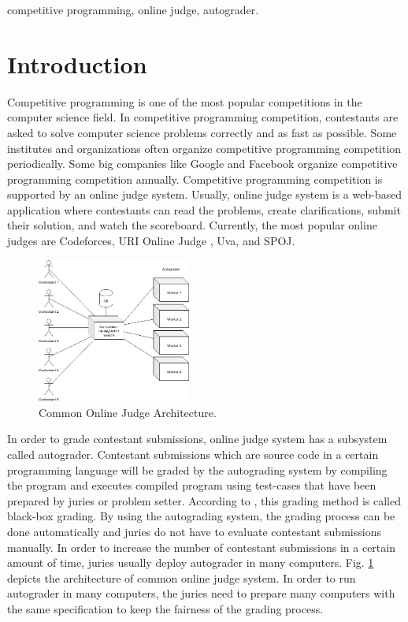 \documentclass[conference,a4paper]{IEEEtran}
\begin{document}
\begin{IEEEkeywords}
competitive programming, online judge, autograder.
\end{IEEEkeywords}

\section{Introduction}

Competitive programming is one of the most popular competitions in the computer science field. In competitive programming competition, contestants are asked to solve computer science problems correctly and as fast as possible. Some institutes and organizations often organize competitive programming competition periodically. Some big companies like Google and Facebook organize competitive programming competition annually. Competitive programming competition is supported by an online judge system. Usually, online judge system is a web-based application where contestants can read the problems, create clarifications, submit their solution, and watch the scoreboard. Currently, the most popular online judges are Codeforces, URI Online Judge \cite{uriojpaper}, Uva, and SPOJ.

\begin{figure}[htbp]
\centerline{\includegraphics[width=0.45\textwidth]{images/paper-architecture-old.jpeg}}
\caption{Common Online Judge Architecture.}
\label{architecture-old}
\end{figure}

In order to grade contestant submissions, online judge system has a subsystem called autograder. Contestant submissions which are source code in a certain programming language will be graded by the autograding system by compiling the program and executes compiled program using test-cases that have been prepared by juries or problem setter. According to \cite{jordanioi}, this grading method is called black-box grading. By using the autograding system, the grading process can be done automatically and juries do not have to evaluate contestant submissions manually. In order to increase the number of contestant submissions in a certain amount of time, juries usually deploy autograder in many computers. Fig. \ref{architecture-old} depicts the architecture of common online judge system. In order to run autograder in many computers, the juries need to prepare many computers with the same specification to keep the fairness of the grading process.
\end{document}
